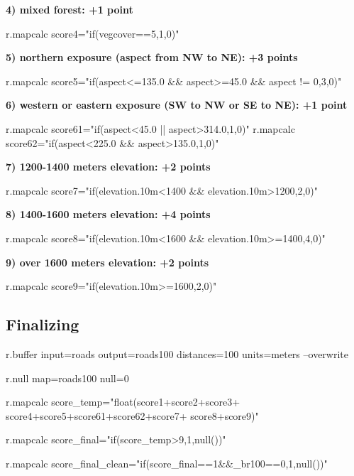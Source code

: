 \textbf{
4) mixed forest: +1 point}
\begin{smallverbatim}
r.mapcalc score4="if(vegcover==5,1,0)"
\end{smallverbatim}

\textbf{
5) northern exposure (aspect from NW to NE): +3 points}
\begin{smallverbatim}
r.mapcalc score5="if(aspect<=135.0 && aspect>=45.0
 && aspect != 0,3,0)"
\end{smallverbatim}

\textbf{
6) western or eastern exposure (SW to NW or SE to NE): +1 point}
\begin{smallverbatim}
r.mapcalc score61="if(aspect<45.0 ||
 aspect>314.0,1,0)"
r.mapcalc score62="if(aspect<225.0 &&
 aspect>135.0,1,0)"
\end{smallverbatim}

\textbf{
7) 1200-1400 meters elevation: +2 points}
\begin{smallverbatim}
r.mapcalc score7="if(elevation.10m<1400
 && elevation.10m>1200,2,0)"
\end{smallverbatim}

\textbf{
8) 1400-1600 meters elevation: +4 points}
\begin{smallverbatim}
r.mapcalc score8="if(elevation.10m<1600
 && elevation.10m>=1400,4,0)"
\end{smallverbatim}

\textbf{
9) over 1600 meters elevation: +2 points}
\begin{smallverbatim}
r.mapcalc score9="if(elevation.10m>=1600,2,0)"
\end{smallverbatim}

\subsection{Finalizing}

\begin{smallverbatim}
r.buffer input=roads output=roads100
 distances=100 units=meters --overwrite

r.null map=roads100 null=0

r.mapcalc score_temp="float(score1+score2+score3+
 score4+score5+score61+score62+score7+
score8+score9)"

r.mapcalc score_final="if(score_temp>9,1,null())"

r.mapcalc score_final_clean="if(score_final==1&&_br100==0,1,null())"
\end{smallverbatim}


